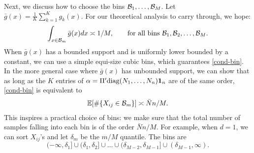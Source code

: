 \documentclass[preprint,11pt]{article}
\numberwithin{equation}{section}
\newcommand{\beq}{\begin{equation}}
\newcommand{\eeq}{\end{equation}}
\newcommand{\diag}{\mathrm{diag}}
\begin{document}
Next, we discuss how to choose the bins ${\cal B}_1, \ldots, {\cal B}_M$. 
Let $\bar{g}(x)=\frac{1}{K}\sum_{k=1}^K g_k(x)$.
For our theoretical analysis to carry through,  we hope: 
\beq \label{cond-bin}
\int_{x\in {\cal B}_m} \bar{g}(x)dx \asymp 1/M, \qquad\mbox{for all bins }{\cal B}_1, {\cal B}_2, \ldots, {\cal B}_M. 
\eeq
 When $\bar{g}(x)$ has a bounded support and is uniformly lower bounded by a constant, we can use a simple equi-size cubic bins, which guarantees \eqref{cond-bin}. 
In the more general case where $\bar{g}(x)$ has unbounded support, we can show that as long as the $K$ entries of $\alpha=\Pi'\diag(N_1,\ldots, N_n){\bf 1}_n$ are of the same order, 
\eqref{cond-bin} is equivalent to
\beq \label{cond-bin-2}
\mathbb{E}[\#\{X_{ij}\in {\cal B}_m\}] \asymp \bar{N}n/M. 
\eeq
This inspires a practical choice of bins: we make sure that the total number of samples falling into each bin is of the order $\bar{N}n/M$. For example, when $d=1$, we can sort 
$X_{ij}$'s and let $\delta_m$ be the $m/M$ quantile. The bins are 
\beq \label{bins-d=1}
(-\infty, \delta_1] \cup (\delta_1, \delta_2] \cup \ldots \cup (\delta_{M-2}, \delta_{M-1}] \cup  (\delta_{M-1}, \infty).  
\eeq
\end{document}
